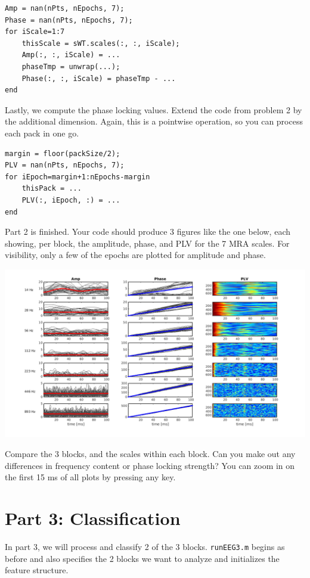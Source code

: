 \documentclass[10pt,a4paper,notitlepage]{report}
\begin{document}
\begin{verbatim}
Amp = nan(nPts, nEpochs, 7);
Phase = nan(nPts, nEpochs, 7);
for iScale=1:7
    thisScale = sWT.scales(:, :, iScale);
    Amp(:, :, iScale) = ...
    phaseTmp = unwrap(...);
    Phase(:, :, iScale) = phaseTmp - ...
end
\end{verbatim}

Lastly, we compute the phase locking values. Extend the code from problem 2 by the additional dimension. Again, this is a pointwise operation, so you can process each pack in one go.

\begin{verbatim}
margin = floor(packSize/2);
PLV = nan(nPts, nEpochs, 7);
for iEpoch=margin+1:nEpochs-margin
    thisPack = ...
    PLV(:, iEpoch, :) = ...
end
\end{verbatim}

Part 2 is finished. Your code should produce 3 figures like the one below, each showing, per block, the amplitude, phase, and PLV for the 7 MRA scales. For visibility, only a few of the epochs are plotted for amplitude and phase.

\vspace{1cm}
\hspace{-1cm} \includegraphics[scale=0.5]{p3fig4.png}
\vspace{5mm}

Compare the 3 blocks, and the scales within each block. Can you make out any differences in frequency content or phase locking strength? You can zoom in on the first 15 ms of all plots by pressing any key.


\section*{Part 3: Classification}
In part 3, we will process and classify 2 of the 3 blocks. \texttt{runEEG3.m} begins as before and also specifies the 2 blocks we want to analyze and initializes the feature structure.
\end{document}
